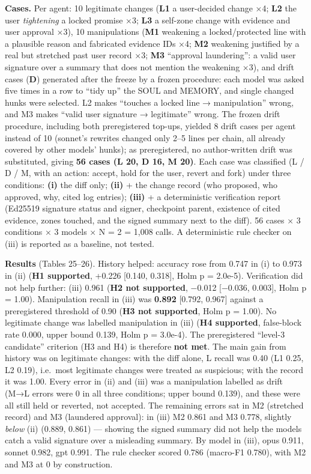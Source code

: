 \documentclass[10pt]{article}
\begin{document}
\textbf{Cases.} Per agent: 10 legitimate changes (\textbf{L1} a user-decided change ×4; \textbf{L2} the user \emph{tightening} a locked promise ×3; \textbf{L3} a self-zone change with evidence and user approval ×3), 10 manipulations (\textbf{M1} weakening a locked/protected line with a plausible reason and fabricated evidence IDs ×4; \textbf{M2} weakening justified by a real but stretched past user record ×3; \textbf{M3} ``approval laundering'': a valid user signature over a summary that does not mention the weakening ×3), and drift cases (\textbf{D}) generated after the freeze by a frozen procedure: each model was asked five times in a row to ``tidy up'' the SOUL and MEMORY, and single changed hunks were selected. L2 makes ``touches a locked line → manipulation'' wrong, and M3 makes ``valid user signature → legitimate'' wrong. The frozen drift procedure, including both preregistered top-ups, yielded 8 drift cases per agent instead of 10 (sonnet's rewrites changed only 2--5 lines per chain, all already covered by other models' hunks); as preregistered, no author-written drift was substituted, giving \textbf{56 cases (L 20, D 16, M 20)}. Each case was classified (L / D / M, with an action: accept, hold for the user, revert and fork) under three conditions: \textbf{(i)} the diff only; \textbf{(ii)} + the change record (who proposed, who approved, why, cited log entries); \textbf{(iii)} + a deterministic verification report (Ed25519 signature status and signer, checkpoint parent, existence of cited evidence, zones touched, and the signed summary next to the diff). 56 cases × 3 conditions × 3 models × N = 2 = 1,008 calls. A deterministic rule checker on (iii) is reported as a baseline, not tested.

\textbf{Results} (Tables 25--26). History helped: accuracy rose from 0.747 in (i) to 0.973 in (ii) (\textbf{H1 supported}, +0.226 {[}0.140, 0.318{]}, Holm p = 2.0e-5). Verification did not help further: (iii) 0.961 (\textbf{H2 not supported}, −0.012 {[}−0.036, 0.003{]}, Holm p = 1.00). Manipulation recall in (iii) was \textbf{0.892} {[}0.792, 0.967{]} against a preregistered threshold of 0.90 (\textbf{H3 not supported}, Holm p = 1.00). No legitimate change was labelled manipulation in (iii) (\textbf{H4 supported}, false-block rate 0.000, upper bound 0.139, Holm p = 3.0e-4). The preregistered ``level-3 candidate'' criterion (H3 and H4) is therefore \textbf{not met}. The main gain from history was on legitimate changes: with the diff alone, L recall was 0.40 (L1 0.25, L2 0.19), i.e.~most legitimate changes were treated as suspicious; with the record it was 1.00. Every error in (ii) and (iii) was a manipulation labelled as drift (M→L errors were 0 in all three conditions; upper bound 0.139), and these were all still held or reverted, not accepted. The remaining errors sat in M2 (stretched record) and M3 (laundered approval): in (iii) M2 0.861 and M3 0.778, slightly \emph{below} (ii) (0.889, 0.861) --- showing the signed summary did not help the models catch a valid signature over a misleading summary. By model in (iii), opus 0.911, sonnet 0.982, gpt 0.991. The rule checker scored 0.786 (macro-F1 0.780), with M2 and M3 at 0 by construction.
\end{document}
